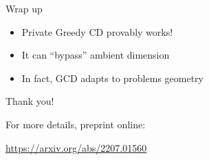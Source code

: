 \documentclass[aspectratio=169,17pt,t]{beamer}
\begin{document}
\begin{frame}{Wrap up}
  \begin{itemize}
  \item Private Greedy CD provably works!
    \vspace{0.5em}
  \item It can ``bypass'' ambient dimension
    \vspace{0.5em}
  \item In fact, GCD adapts to problems geometry
  \end{itemize}

\end{frame}



\begin{frame}{Thank you!}

  \vspace{1em}

  For more details, preprint online:

  \hspace{2em}\url{https://arxiv.org/abs/2207.01560}
\end{frame}


\end{document}
